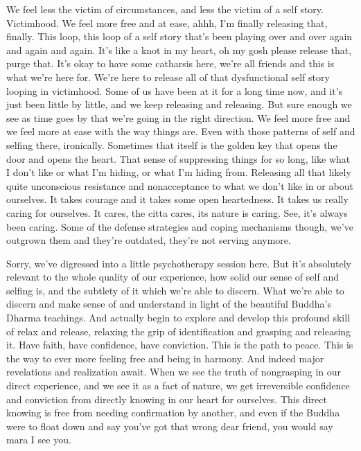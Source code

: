 \documentclass[12pt,openany]{book}
\begin{document}
We feel less the victim of circumstances, and less the victim of a self story. Victimhood. We feel more free and at ease, ahhh, I’m finally releasing that, finally. This loop, this loop of a self story that’s been playing over and over again and again and again. It's like a knot in my heart, oh my gosh please release that, purge that. It's okay to have some catharsis here, we're all friends and this is what we're here for. We're here to release all of that dysfunctional self story looping in victimhood. Some of us have been at it for a long time now, and it's just been little by little, and we keep releasing and releasing. But sure enough we see as time goes by that we're going in the right direction. We feel more free and we feel more at ease with the way things are. Even with those patterns of self and selfing there, ironically. Sometimes that itself is the golden key that opens the door and opens the heart. That sense of suppressing things for so long, like what I don't like or what I'm hiding, or what I'm hiding from. Releasing all that likely quite unconscious resistance and nonacceptance to what we don't like in or about ourselves. It takes courage and it takes some open heartedness. It takes us really caring for ourselves. It cares, the citta cares, its nature is caring. See, it's always been caring. Some of the defense strategies and coping mechanisms though, we've outgrown them and they're outdated, they're not serving anymore.

Sorry, we've digressed into a little psychotherapy session here. But it's absolutely relevant to the whole quality of our experience, how solid our sense of self and selfing is, and the subtlety of it which we're able to discern. What we're able to discern and make sense of and understand in light of the beautiful Buddha’s Dhar\-ma teachings. And actually begin to explore and develop this profound skill of relax and release, relaxing the grip of identification and grasping and releasing it. Have faith, have confidence, have conviction. This is the path to peace. This is the way to ever more feeling free and being in harmony. And indeed major revelations and realization await. When we see the truth of nongrasping in our direct experience, and we see it as a fact of nature, we get irreversible confidence and conviction from directly knowing in our heart for ourselves. This direct knowing is free from needing confirmation by another, and even if the Buddha were to float down and say you’ve got that wrong dear friend, you would say mara I see you.
\end{document}
